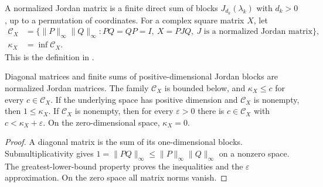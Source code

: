 
\begin{definition}
    \label{def:wolf_jordan_condition_number}
    \leanok
    A normalized Jordan matrix is a finite direct sum of blocks
    $J_{d_k}(\lambda_k)$ with $d_k>0$, up to a permutation of coordinates.
    For a complex square matrix $X$, let
    \begin{align}
      \mathcal C_X&=\{\lVert P\rVert_\infty\lVert Q\rVert_\infty:
        PQ=QP=I,\ X=PJQ,\ J\text{ is a normalized Jordan matrix}\},\\
      \kappa_X&=\inf\mathcal C_X.
    \end{align}
    This is the definition in \cite[Chapter~8]{Wolf2012Quantum}.
\end{definition}

\begin{theorem}
    \label{thm:wolf_jordan_condition_infimum}
    \leanok
    Diagonal matrices and finite sums of positive-dimensional Jordan blocks
    are normalized Jordan matrices. The family $\mathcal C_X$ is bounded
    below, and $\kappa_X\le c$ for every $c\in\mathcal C_X$.
    If the underlying space has positive dimension and $\mathcal C_X$ is
    nonempty, then $1\le\kappa_X$. If $\mathcal C_X$ is nonempty, then
    for every $\varepsilon>0$ there is $c\in\mathcal C_X$ with
    $c<\kappa_X+\varepsilon$.
    On the zero-dimensional space, $\kappa_X=0$.
\end{theorem}
\begin{proof}
    \leanok
    A diagonal matrix is the sum of its one-dimensional blocks.
    Submultiplicativity gives $1=\lVert PQ\rVert_\infty
    \le\lVert P\rVert_\infty\lVert Q\rVert_\infty$ on a nonzero space.
    The greatest-lower-bound property proves the inequalities and the
    $\varepsilon$ approximation. On the zero space all matrix norms vanish.
\end{proof}

